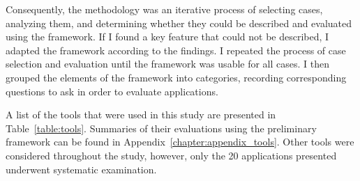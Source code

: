 {Consequently, the methodology was an iterative process of selecting cases, analyzing them, and determining whether they could be described and evaluated using the framework. If I found a key feature that could not be described, I adapted the framework according to the findings. I repeated the process of case selection and evaluation until the framework was usable for all cases. I then grouped the elements of the framework into categories, recording corresponding questions to ask in order to evaluate applications. 

A list of the tools that were used in this study are presented in Table~\ref{table:tools}. Summaries of their evaluations using the preliminary framework can be found in Appendix~\ref{chapter:appendix_tools}. Other tools were considered throughout the study, however, only the 20 applications presented underwent systematic examination. 

\begin{table*}[htbp]
\small
\label{table:tools}
\caption{Web-based Information Discovery and Curation Tools as of May 15, 2014}

\begin{tabular}{|p{0.20\linewidth}| p{0.30\linewidth}| p{0.45\linewidth}|}


\end{tabular}
\end{table*}}
